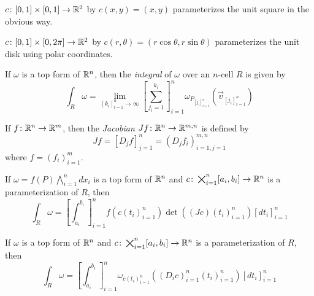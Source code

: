 \documentclass[notes]{subfiles}
\begin{document}
\begin{example}
    $c\colon [0, 1] \times [0, 1] \to \mathbb{R}^2$ by $c(x, y) = (x, y)$ parameterizes the unit square in the obvious way.
\end{example}

\begin{example}
    $c\colon [0, 1] \times [0, 2\pi] \to \mathbb{R}^2$ by $c(r, \theta) = (r\cos\theta, r\sin\theta)$ parameterizes the unit disk using polar coordinates.
\end{example}

\begin{definition}
    If $\omega$ is a top form of $\mathbb{R}^n$, then the \textit{integral} of $\omega$ over an $n$-cell $R$ is given by
    \[
        \int_R \omega = \lim_{[k_i]_{i = 1}^n \to \infty} \left[ \sum_{j_i = 1}^{k_i} \right]_{i = 1}^n \omega_{P_{[j_i]_{i = 1}^n}}(\vec{v}_{[j_i]_{i = 1}^n})
    \]
\end{definition}

\begin{definition}[Jacobian]
    If $f\colon \mathbb{R}^n \to \mathbb{R}^m$, then the \textit{Jacobian} $Jf\colon \mathbb{R}^n \to \mathbb{R}^{m, n}$ is defined by
    \[
        Jf = [ D_j f ]_{j = 1}^n = ( D_j f_i )_{i = 1, j = 1}^{m, n}
    \]
    where $f = (f_i)_{i = 1}^m$.
\end{definition}

\begin{theorem}
    If $\omega = f(P)\bigwedge_{i = 1}^n dx_i$ is a top form of $\mathbb{R}^n$ and $c\colon \bigtimes_{i = 1}^n [a_i, b_i] \to \mathbb{R}^n$ is a parameterization of $R$, then
    \[
        \int_R \omega = \left[ \int_{a_i}^{b_i} \right]_{i = 1}^n f(c(t_i)_{i = 1}^n) \det((Jc)(t_i)_{i = 1}^n) [dt_i]_{i = 1}^n
    \]
\end{theorem}

\begin{theorem}
    If $\omega$ is a top form of $\mathbb{R}^n$ and $c\colon \bigtimes_{i = 1}^n [a_i, b_i] \to \mathbb{R}^n$ is a parameterization of $R$, then
    \[
        \int_R \omega = \left[ \int_{a_i}^{b_i} \right]_{i = 1}^n \omega_{c(t_i)_{i = 1}^n}((D_i c)_{i = 1}^n(t_i)_{i = 1}^n) [dt_i]_{i = 1}^n
    \]
\end{theorem}
\end{document}
